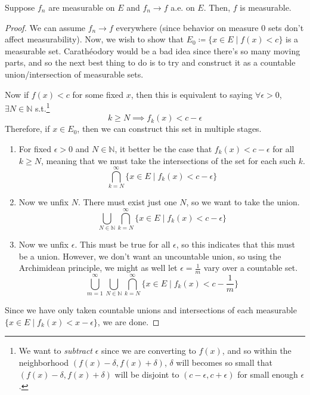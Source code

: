   \begin{theorem}
    Suppose $f_n$ are measurable on $E$ and $f_n \to f$ a.e. on $E$. Then, $f$ is measurable. 
  \end{theorem}
  \begin{proof}
    We can assume $f_n \to f$ everywhere (since behavior on measure $0$ sets don't affect measurability). Now, we wish to show that $E_0 \coloneqq \{x \in E \mid f(x) < c\}$ is a measurable set. Carathéodory would be a bad idea since there's so many moving parts, and so the next best thing to do is to try and construct it as a countable union/intersection of measurable sets. 

    Now if $f(x) < c$ for some fixed $x$, then this is equivalent to saying $\forall \epsilon > 0$, $\exists N \in \mathbb{N}$ s.t.\footnote{We want to \textit{subtract} $\epsilon$ since we are converting to $f(x)$, and so within the neighborhood $(f(x) - \delta, f(x) + \delta)$, $\delta$ will becomes so small that $(f(x) - \delta, f(x) + \delta)$ will be disjoint to $(c - \epsilon, c + \epsilon)$ for small enough $\epsilon$. }
    \begin{equation}
      k \geq N \implies f_k (x) < c - \epsilon 
    \end{equation}
    Therefore, if $x \in E_0$, then we can construct this set in multiple stages. 
    \begin{enumerate}
      \item For fixed $\epsilon > 0$ and $N \in \mathbb{N}$, it better be the case that $f_k (x) < c - \epsilon$ for all $k \geq N$, meaning that we must take the intersections of the set for each such $k$. 
      \begin{equation}
        \bigcap_{k = N}^\infty \{ x \in E \mid f_k (x) < c - \epsilon \}
      \end{equation}

      \item Now we unfix $N$. There must exist just one $N$, so we want to take the union. 
      \begin{equation}
        \bigcup_{N \in \mathbb{N}} \bigcap_{k = N}^\infty \{ x \in E \mid f_k (x) < c - \epsilon \}
      \end{equation}

      \item Now we unfix $\epsilon$. This must be true for all $\epsilon$, so this indicates that this must be a union. However, we don't want an uncountable union, so using the Archimidean principle, we might as well let $\epsilon = \frac{1}{m}$ vary over a countable set.  
      \begin{equation}
        \bigcup_{m = 1}^\infty \bigcup_{N \in \mathbb{N}} \bigcap_{k = N}^\infty \{ x \in E \mid f_k (x) < c - \frac{1}{m} \}
      \end{equation}
    \end{enumerate}
    Since we have only taken countable unions and intersections of each measurable $\{x \in E \mid f_k (x) < x - \epsilon\}$, we are done. 
  \end{proof}


